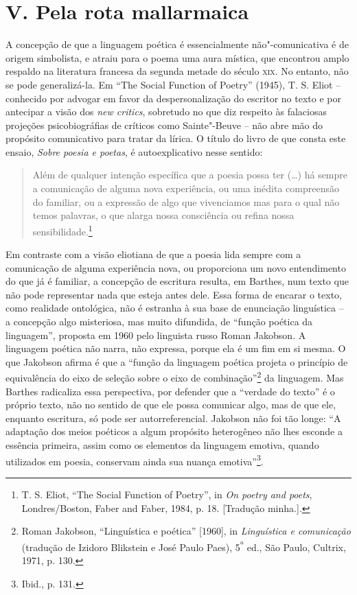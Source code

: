 \section*{V. Pela rota mallarmaica}

A concepção de que a linguagem poética é essencialmente não"-comunicativa
é de origem simbolista, e atraiu para o poema uma aura mística, que
encontrou amplo respaldo na literatura francesa da segunda metade do
século \textsc{xix}. No entanto, não se pode generalizá-la. Em ``The
Social Function of Poetry'' (1945), T. S. Eliot -- conhecido por advogar
em favor da despersonalização do escritor no texto e por antecipar a
visão dos \emph{new critics}, sobretudo no que diz respeito às
falaciosas projeções psicobiográfias de críticos como Sainte"-Beuve --
não abre mão do propósito comunicativo para tratar da lírica. O título
do livro de que consta este ensaio, \emph{Sobre poesia e poetas}, é
autoexplicativo nesse sentido:

\begin{quote}
Além de qualquer intenção específica que a poesia possa ter (\ldots{}) há
sempre a comunicação de alguma nova experiência, ou uma inédita
compreensão do familiar, ou a expressão de algo que vivenciamos mas para
o qual não temos palavras, o que alarga nossa consciência ou refina
nossa sensibilidade.\footnote{T. S. Eliot, ``The Social Function of
  Poetry'', in \emph{On poetry and poets}, Londres/Boston, Faber and
  Faber, 1984, p. 18. {[}Tradução minha.{]}.}
\end{quote}

Em contraste com a visão eliotiana de que a poesia lida sempre com a
comunicação de alguma experiência nova, ou proporciona um novo
entendimento do que já é familiar, a concepção de escritura resulta, em
Barthes, num texto que não pode representar nada que esteja antes dele.
Essa forma de encarar o texto, como realidade ontológica, não é estranha
à sua base de enunciação linguística -- a concepção algo misteriosa, mas
muito difundida, de ``função poética da linguagem'', proposta em 1960
pelo linguista russo Roman Jakobson. A linguagem poética não narra, não
expressa, porque ela é um fim em si mesma. O que Jakobson afirma é que a
``função da linguagem poética projeta o princípio de equivalência do
eixo de seleção sobre o eixo de combinação''\footnote{Roman Jakobson,
  ``Linguística e poética'' {[}1960{]}, in \emph{Linguística e
  comunicação} (tradução de Izidoro Blikstein e José Paulo Paes),
  5\textsuperscript{ª} ed., São Paulo, Cultrix, 1971, p. 130.} da
linguagem. Mas Barthes radicaliza essa perspectiva, por defender que a
``verdade do texto'' é o próprio texto, não no sentido de que ele possa
comunicar algo, mas de que ele, enquanto escritura, só pode ser
autorreferencial. Jakobson não foi tão longe: ``A adaptação dos meios
poéticos a algum propósito heterogêneo não lhes esconde a essência
primeira, assim como os elementos da linguagem emotiva, quando
utilizados em poesia, conservam ainda sua nuança emotiva''\footnote{Ibid.,
  p. 131.}.

